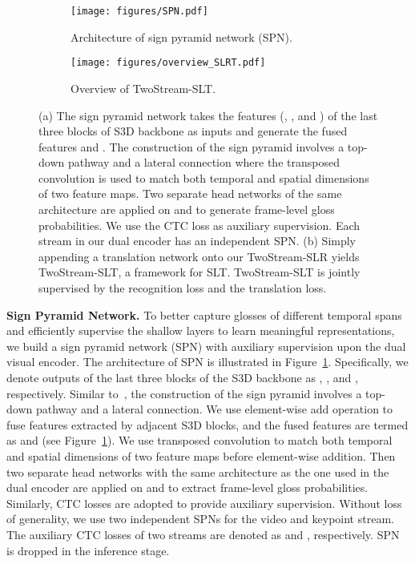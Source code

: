 \documentclass{article}
\begin{document}
\begin{figure}[t]
     \begin{subfigure}{.615\textwidth}
         \centering
         \texttt{[image: figures/SPN.pdf]}
         \caption{Architecture of sign pyramid network (SPN).}
         \label{fig:SPN}
     \end{subfigure}
\hfill
\begin{subfigure}{.365\textwidth}
  \centering
  \texttt{[image: figures/overview\_SLRT.pdf]}
  \caption{Overview of TwoStream-SLT.}
  \label{fig:TSN-SLRT}
\end{subfigure}
\caption{(a) The sign pyramid network takes the features (, , and ) of the last three blocks of S3D backbone as inputs and generate the fused features  and . The construction of the sign pyramid involves a top-down pathway and a lateral connection where the transposed convolution is used to match both temporal and spatial dimensions of two feature maps. Two separate head networks of the same architecture are applied on  and  to generate frame-level gloss probabilities. We use the CTC loss as auxiliary supervision. Each stream in our dual encoder has an independent SPN. (b) Simply appending a translation network onto our TwoStream-SLR yields TwoStream-SLT, a framework for SLT. TwoStream-SLT is jointly supervised by the recognition loss and the translation loss.}
\label{fig:spn_tsn_slrt}
\end{figure}

\textbf{Sign Pyramid Network.}
To better capture glosses of different temporal spans and efficiently supervise the shallow layers to learn meaningful representations, we build a sign pyramid network (SPN) with auxiliary supervision upon the dual visual encoder. The architecture of SPN is illustrated in Figure~\ref{fig:SPN}. Specifically, we denote outputs of the last three blocks of the S3D backbone as , , and , respectively. Similar to~\cite{yang2020temporal}, the construction of the sign pyramid involves a top-down pathway and a lateral connection. We use element-wise add operation to fuse features extracted by adjacent S3D blocks, and the fused features are termed as  and  (see Figure~\ref{fig:SPN}). We use transposed convolution to match both temporal and spatial dimensions of two feature maps before element-wise addition. Then two separate head networks with the same architecture as the one used in the dual encoder are applied on  and  to extract frame-level gloss probabilities. Similarly, CTC losses are adopted to provide auxiliary supervision. Without loss of generality, we use two independent SPNs for the video and keypoint stream. The auxiliary CTC losses of two streams are denoted as  and , respectively. SPN is dropped in the inference stage.
\end{document}
